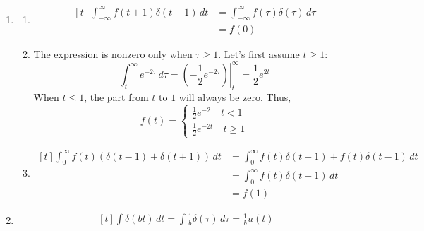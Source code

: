 \documentclass[12pt]{article}
\begin{document}
\begin{enumerate}
\begin{enumerate}
\begin{enumerate}
                        \end{enumerate}
                  \item \begin{enumerate}
                              \item \[\begin{aligned}[t]
                                                \int_{-\infty}^{\infty} f(t+1)\delta(t+1)\,dt
                                                 & = \int_{-\infty}^{\infty} f(\tau)\delta(\tau)\,d\tau \\
                                                 & = \boxed{f(0)}
                                          \end{aligned}\]
                              \item The expression is nonzero only when $\tau \ge 1$.
                                    Let's first assume $t \ge 1$:
                                    \[\int_{t}^{\infty} e^{-2\tau}\,d\tau = \left.\left(-\frac{1}{2}e^{-2\tau}\right)\right|^\infty_t = \frac{1}{2}e^{2t}\]
                                    When $t \le 1$, the part from $t$ to $1$ will always be zero.
                                    Thus,
                                    \[f(t)=\begin{cases}
                                                \frac{1}{2}e^{-2}\quad t < 1 \\
                                                \frac{1}{2}e^{-2t}\quad t \ge 1
                                          \end{cases}\]
                              \item \[\begin{aligned}[t]
                                                \int_{0}^{\infty} f(t)(\delta(t-1)+\delta(t+1))\,dt
                                                 & = \int_{0}^{\infty} f(t)\delta(t-1)+f(t)\delta(t-1)\,dt \\
                                                 & = \int_{0}^{\infty} f(t)\delta(t-1)\,dt                 \\
                                                 & = \boxed{f(1)}
                                          \end{aligned}\]
                        \end{enumerate}
                  \item \[\begin{gathered}[t]
                                    \int \delta(bt)\,dt = \int \frac{1}{b}\delta(\tau)\,d\tau=\frac{1}{b}u(t) \\

\end{gathered}\]
\end{enumerate}
\end{enumerate}
\end{document}
